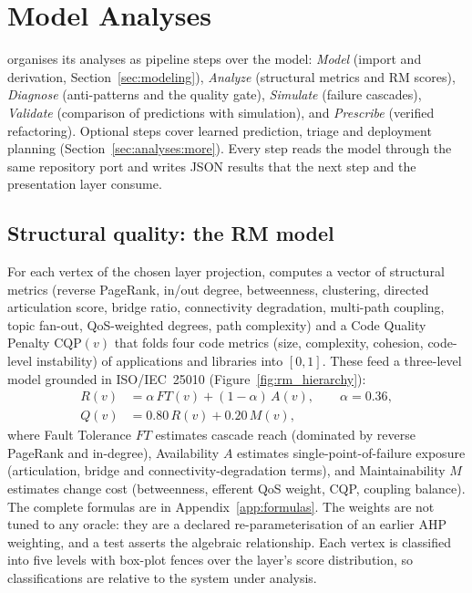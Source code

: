 \section{Model Analyses}
\label{sec:analyses}

\sag{} organises its analyses as pipeline steps over the model: \emph{Model} (import and derivation, Section~\ref{sec:modeling}), \emph{Analyze} (structural metrics and RM scores), \emph{Diagnose} (anti-patterns and the quality gate), \emph{Simulate} (failure cascades), \emph{Validate} (comparison of predictions with simulation), and \emph{Prescribe} (verified refactoring). Optional steps cover learned prediction, triage and deployment planning (Section~\ref{sec:analyses:more}). Every step reads the model through the same repository port and writes JSON results that the next step and the presentation layer consume.

\subsection{Structural quality: the RM model}
\label{sec:analyses:rm}

For each vertex of the chosen layer projection,  computes a vector of structural metrics (reverse PageRank, in/out degree, betweenness, clustering, directed articulation score, bridge ratio, connectivity degradation, multi-path coupling, topic fan-out, QoS-weighted degrees, path complexity) and a Code Quality Penalty $\mathrm{CQP}(v)$ that folds four code metrics (size, complexity, cohesion, code-level instability) of applications and libraries into $[0,1]$. These feed a three-level model grounded in ISO/IEC~25010 (Figure~\ref{fig:rm_hierarchy}):
\begin{align}
R(v) &= \alpha\,FT(v) + (1-\alpha)\,A(v), \qquad \alpha = 0.36, \\
Q(v) &= 0.80\,R(v) + 0.20\,M(v),
\end{align}
where Fault Tolerance $FT$ estimates cascade reach (dominated by reverse PageRank and in-degree), Availability $A$ estimates single-point-of-failure exposure (articulation, bridge and connectivity-degradation terms), and Maintainability $M$ estimates change cost (betweenness, efferent QoS weight, CQP, coupling balance). The complete formulas are in Appendix~\ref{app:formulas}. The weights are not tuned to any oracle: they are a declared re-parameterisation of an earlier AHP weighting, and a test asserts the algebraic relationship. Each vertex is classified into five levels with box-plot fences over the layer's score distribution, so classifications are relative to the system under analysis.

